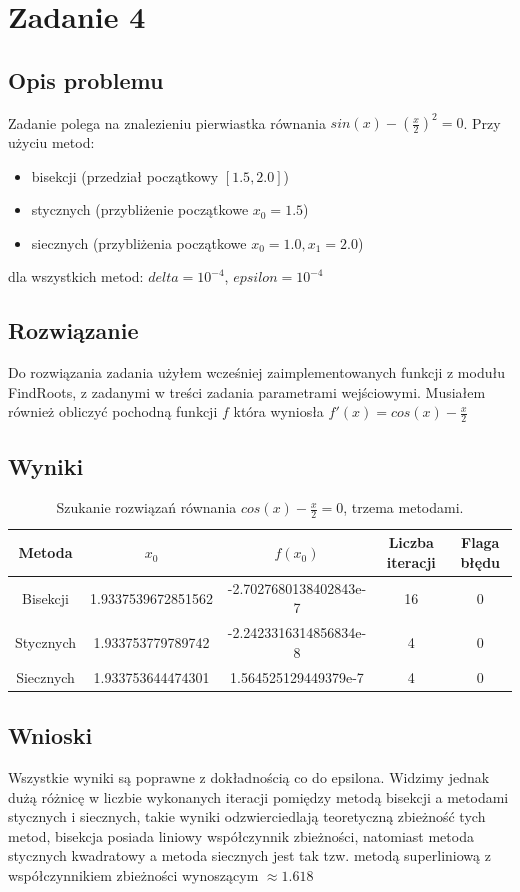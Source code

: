 \documentclass[12pt, a4paper]{article}
\begin{document}
\newpage

\section{Zadanie 4}
		
\subsection{Opis problemu}
Zadanie polega na znalezieniu pierwiastka  równania $sin(x) - (\frac{x}{2})^{2} = 0$. Przy użyciu metod:
\begin{itemize}  
\item bisekcji (przedział początkowy $[1.5, 2.0]$)
\item stycznych (przybliżenie początkowe $x_{0} = 1.5$)
\item siecznych (przybliżenia początkowe $x_{0} = 1.0, x_{1} = 2.0$)
\end{itemize}
dla wszystkich metod:
$delta = 10^{-4}$, $epsilon = 10^{-4}$

\subsection{Rozwiązanie}
Do rozwiązania zadania użyłem wcześniej zaimplementowanych funkcji z modułu FindRoots, z zadanymi w treści zadania parametrami wejściowymi. Musiałem również obliczyć pochodną funkcji $f$ która wyniosła $f'(x) = cos(x)-\frac{x}{2}$

\subsection{Wyniki}
\begin{table}[h]
        \centering
        \footnotesize
        \renewcommand{\arraystretch}{1.5}
\begin{tabular}{c|c|c|c|c} 
Metoda & $x_{0}$ & $f(x_{0})$ & Liczba iteracji & Flaga błędu\\
\hline
Bisekcji &1.9337539672851562&-2.7027680138402843e-7& 16 & 0 \\
Stycznych &1.933753779789742&-2.2423316314856834e-8& 4 & 0 \\
Siecznych &1.933753644474301&1.564525129449379e-7& 4 & 0 \\
\end{tabular}
\caption{Szukanie rozwiązań równania $cos(x)-\frac{x}{2} = 0$, trzema metodami.}
\end{table}

\subsection{Wnioski}
Wszystkie wyniki są poprawne z dokładnością co do epsilona. Widzimy jednak 
dużą różnicę w liczbie wykonanych iteracji pomiędzy metodą bisekcji a metodami stycznych i siecznych, takie  wyniki odzwierciedlają teoretyczną zbieżność tych metod, bisekcja posiada liniowy współczynnik zbieżności, natomiast metoda stycznych kwadratowy a metoda siecznych jest tak tzw. metodą superliniową z współczynnikiem zbieżności wynoszącym $\approx1.618$
\end{document}
